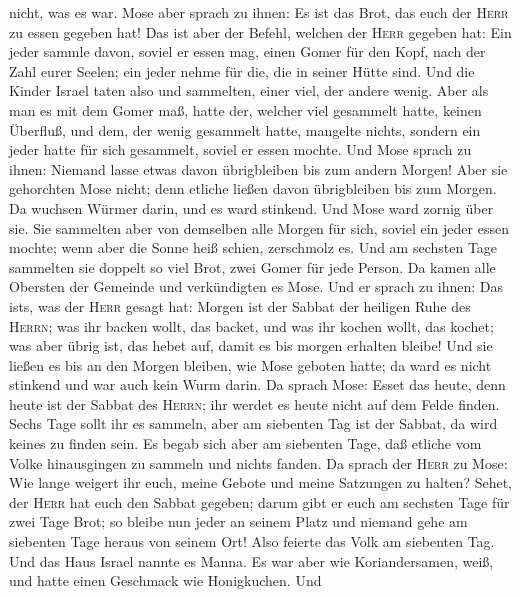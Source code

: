 nicht, was es war. Mose aber sprach zu ihnen: Es ist das Brot, das euch
der \textsc{Herr} zu essen gegeben hat!  Das ist aber der
Befehl, welchen der \textsc{Herr} gegeben hat: Ein jeder sammle davon,
soviel er essen mag, einen Gomer für den Kopf, nach der Zahl eurer
Seelen; ein jeder nehme für die, die in seiner Hütte sind.
 Und die Kinder Israel taten also und sammelten, einer
viel, der andere wenig.  Aber als man es mit dem Gomer
maß, hatte der, welcher viel gesammelt hatte, keinen Überfluß, und dem,
der wenig gesammelt hatte, mangelte nichts, sondern ein jeder hatte für
sich gesammelt, soviel er essen mochte.  Und Mose sprach
zu ihnen: Niemand lasse etwas davon übrigbleiben bis zum andern Morgen!
 Aber sie gehorchten Mose nicht; denn etliche ließen
davon übrigbleiben bis zum Morgen. Da wuchsen Würmer darin, und es ward
stinkend. Und Mose ward zornig über sie.  Sie sammelten
aber von demselben alle Morgen für sich, soviel ein jeder essen mochte;
wenn aber die Sonne heiß schien, zerschmolz es.  Und am
sechsten Tage sammelten sie doppelt so viel Brot, zwei Gomer für jede
Person. Da kamen alle Obersten der Gemeinde und verkündigten es Mose.
 Und er sprach zu ihnen: Das ist\textquotesingle s, was
der \textsc{Herr} gesagt hat: Morgen ist der Sabbat der heiligen Ruhe
des \textsc{Herrn}; was ihr backen wollt, das backet, und was ihr kochen
wollt, das kochet; was aber übrig ist, das hebet auf, damit es bis
morgen erhalten bleibe!  Und sie ließen es bis an den
Morgen bleiben, wie Mose geboten hatte; da ward es nicht stinkend und
war auch kein Wurm darin.  Da sprach Mose: Esset das
heute, denn heute ist der Sabbat des \textsc{Herrn}; ihr werdet es heute
nicht auf dem Felde finden.  Sechs Tage sollt ihr es
sammeln, aber am siebenten Tag ist der Sabbat, da wird keines zu finden
sein.  Es begab sich aber am siebenten Tage, daß etliche
vom Volke hinausgingen zu sammeln und nichts fanden.  Da
sprach der \textsc{Herr} zu Mose: Wie lange weigert ihr euch, meine
Gebote und meine Satzungen zu halten?  Sehet, der
\textsc{Herr} hat euch den Sabbat gegeben; darum gibt er euch am
sechsten Tage für zwei Tage Brot; so bleibe nun jeder an seinem Platz
und niemand gehe am siebenten Tage heraus von seinem Ort!
 Also feierte das Volk am siebenten Tag. 
Und das Haus Israel nannte es Manna. Es war aber wie Koriandersamen,
weiß, und hatte einen Geschmack wie Honigkuchen.  Und
